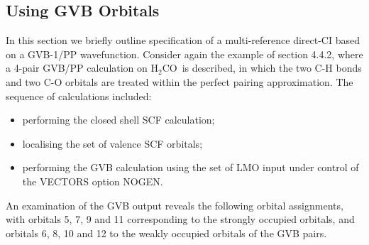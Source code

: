 \documentclass[11pt,fleqn]{article}
\newcommand{\formaldehyde}{\mbox{H$_{2}$CO}}
\begin{document}
\subsection[Using GVB Orbitals]{Using GVB Orbitals}

In this section we briefly outline specification of a multi-reference
direct-CI based on a GVB-1/PP wavefunction.  Consider again the example
of section 4.4.2, where a 4-pair GVB/PP calculation on \formaldehyde\
is described, in which the two C-H bonds and two C-O orbitals are treated
within the perfect pairing approximation.  The sequence of calculations
included:
\begin{itemize}
\item performing  the closed shell SCF calculation;
\item localising  the set of valence SCF orbitals;
\item performing the GVB calculation using the set of LMO
input under control of the VECTORS option NOGEN.
\end{itemize}
An examination of the GVB output reveals the following orbital
assignments, with orbitals 5, 7, 9 and 11 corresponding to the strongly
occupied orbitals, and orbitals 6, 8, 10 and 12 to the weakly occupied
orbitals of the GVB pairs.
\end{document}
